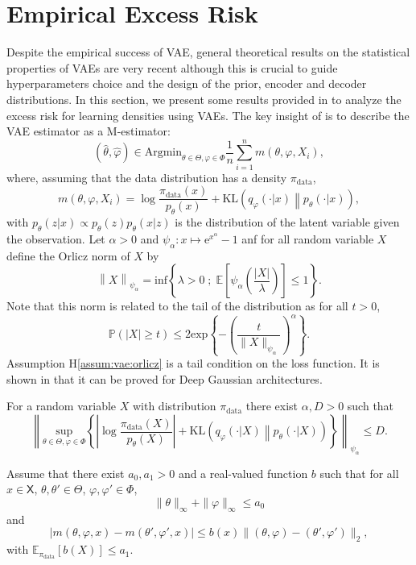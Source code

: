 \documentclass[english,graybox,envcountchap,envcountsame,sectrefs,shortlabels]{svmono}
\theoremstyle{style}
\newcommand{\rme}{\mathrm{e}}
\newcommand{\eqsp}{}
\begin{document}
\section{Empirical Excess Risk}
Despite the empirical success of VAE, general theoretical results on the statistical properties of VAEs are very recent although this is crucial to guide hyperparameters choice and the design of the prior, encoder and decoder distributions. In this section, we present some results provided in \cite{pmlr-v134-tang21a} to analyze the excess risk for learning densities using VAEs.  The key insight of \cite{pmlr-v134-tang21a} is to describe the VAE estimator as a M-estimator:
$$
(\widehat\theta,\widehat\varphi) \in\mathrm{Argmin}_{\theta\in\Theta,\varphi\in\Phi} \frac{1}{n}\sum_{i=1}^n m(\theta,\varphi,X_i)\eqsp,
$$
where, assuming that the data distribution has a density $\pi_{\mathrm{data}}$, 
$$
m(\theta,\varphi,X_i) = \log \frac{\pi_{\mathrm{data}}(x)}{p_\theta(x)} + \mathrm{KL}\left(q_\varphi(\cdot|x)\middle\|p_\theta(\cdot|x)\right)\eqsp,
$$
with $p_\theta(z|x) \propto p_\theta(z)p_\theta(x|z)$ is the distribution of the latent variable given the observation. Let $\alpha>0$ and $\psi_\alpha: x\mapsto \rme^{x^\alpha}-1$ anf for all random variable $X$ define the Orlicz norm of $X$ by
$$
\left\|X\right\|_{\psi_{\alpha}} = \mathrm{inf}\left\{\lambda >0\;;\; \mathbb{E}\left[\psi_\alpha\left(\frac{|X|}{\lambda}\right)\right]\leqslant 1\right\}\eqsp.
$$
Note that this norm is related to the tail of the distribution as for all $t>0$,
$$
\mathbb{P}\left(|X|\geqslant t\right)\leqslant 2\mathrm{exp}\left\{-\left(\frac{t}{\|X\|_{\psi_{\alpha}}}\right)^\alpha\right\}\eqsp.
$$ 
Assumption H\ref{assum:vae:orlicz} is a tail condition on the loss function. It is shown in \cite{pmlr-v134-tang21a} that it can be proved for Deep Gaussian architectures.
\begin{hypH}
\label{assum:vae:orlicz}
For a random variable $X$  with distribution $\pi_{\mathrm{data}}$ there exist $\alpha,D >0$ such that
$$
\left\|\underset{\theta\in\Theta,\varphi\in\Phi}{\mathrm{sup}} \left\{\left|\log \frac{\pi_{\mathrm{data}}(X)}{p_\theta(X)}\right| + \mathrm{KL}\left(q_\varphi(\cdot|X)\middle\|p_\theta(\cdot|X)\right)\right\}\right\|_{\psi_\alpha} \leqslant D\eqsp.
$$
\end{hypH}

\begin{hypH}
\label{assum:vae:lip}
Assume that there exist $a_0, a_1 >0$ and a real-valued function $b$ such that for all $x\in\mathsf{X}$, $\theta,\theta'\in\Theta$, $\varphi,\varphi'\in\Phi$,
$$
\|\theta\|_\infty + \|\varphi\|_\infty \leqslant a_0
$$
and
$$
\left|m(\theta,\varphi,x) - m(\theta',\varphi',x) \right| \leqslant b(x) \|(\theta,\varphi)-(\theta',\varphi')\|_2\eqsp,
$$
with $\mathbb{E}_{\pi_{\mathrm{data}}}[b(X)]\leqslant a_1$.
\end{hypH}
\end{document}
